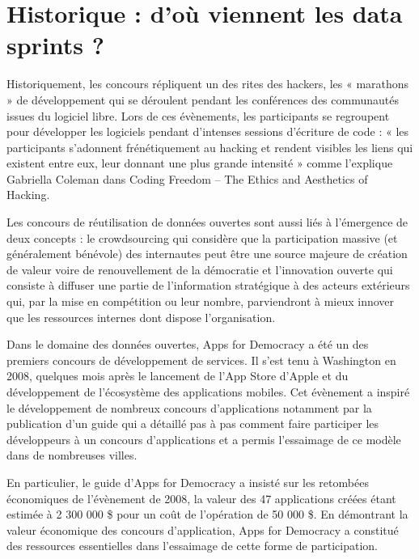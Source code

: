 \documentclass[]{book}
\begin{document}
\section{Historique : d'où viennent les data sprints
?}\label{historique-dou-viennent-les-data-sprints}

Historiquement, les concours répliquent un des rites des hackers, les «
marathons » de développement qui se déroulent pendant les conférences
des communautés issues du logiciel libre. Lors de ces évènements, les
participants se regroupent pour développer les logiciels pendant
d'intenses sessions d'écriture de code : « les participants s'adonnent
frénétiquement au hacking et rendent visibles les liens qui existent
entre eux, leur donnant une plus grande intensité » comme l'explique
Gabriella Coleman dans Coding Freedom -- The Ethics and Aesthetics of
Hacking.

Les concours de réutilisation de données ouvertes sont aussi liés à
l'émergence de deux concepts : le crowdsourcing qui considère que la
participation massive (et généralement bénévole) des internautes peut
être une source majeure de création de valeur voire de renouvellement de
la démocratie et l'innovation ouverte qui consiste à diffuser une partie
de l'information stratégique à des acteurs extérieurs qui, par la mise
en compétition ou leur nombre, parviendront à mieux innover que les
ressources internes dont dispose l'organisation.

Dans le domaine des données ouvertes, Apps for Democracy a été un des
premiers concours de développement de services. Il s'est tenu à
Washington en 2008, quelques mois après le lancement de l'App Store
d'Apple et du développement de l'écosystème des applications mobiles.
Cet évènement a inspiré le développement de nombreux concours
d'applications notamment par la publication d'un guide qui a détaillé
pas à pas comment faire participer les développeurs à un concours
d'applications et a permis l'essaimage de ce modèle dans de nombreuses
villes.

En particulier, le guide d'Apps for Democracy a insisté sur les
retombées économiques de l'évènement de 2008, la valeur des 47
applications créées étant estimée à 2 300 000 \$ pour un coût de
l'opération de 50 000 \$. En démontrant la valeur économique des
concours d'application, Apps for Democracy a constitué des ressources
essentielles dans l'essaimage de cette forme de participation.
\end{document}
